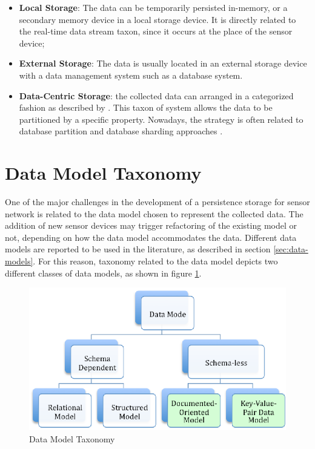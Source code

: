 \begin{itemize}
  \item \textbf{Local Storage}: The data can be temporarily persisted
   in-memory, or a secondary memory device in a local storage device. It is
  directly related to the real-time data stream taxon, since it occurs at
  the place of the sensor device;
  \item \textbf{External Storage}: The data is usually located in an
  external storage device with a data management system such as a database
  system.
  \item \textbf{Data-Centric Storage}: the collected data can arranged in a
  categorized fashion as described by \cite{sn-storage03}. This taxon of
  system allows the data to be partitioned by a specific property. Nowadays,
  the strategy is often related to database partition \cite{db-partition}
  and database sharding approaches \cite{db-shard01} \cite{db-shard02}.
\end{itemize}

\section{Data Model Taxonomy}

One of the major challenges in the development of a persistence storage for
sensor network is related to the data model chosen to represent the collected
data. The addition of new sensor devices may trigger refactoring of the
existing model or not, depending on how the data model accommodates the data.
Different data models are reported to be used in the literature, as described
in section \ref{sec:data-models}. For this reason, taxonomy related to the
data model depicts two different classes of data models, as shown in figure
\ref{fig:taxonomy-data-model}.

\begin{figure}[h]
  \centering
  \includegraphics{../diagrams/taxonomy-data-model}
  \caption{Data Model Taxonomy}
  \label{fig:taxonomy-data-model}
\end{figure}

